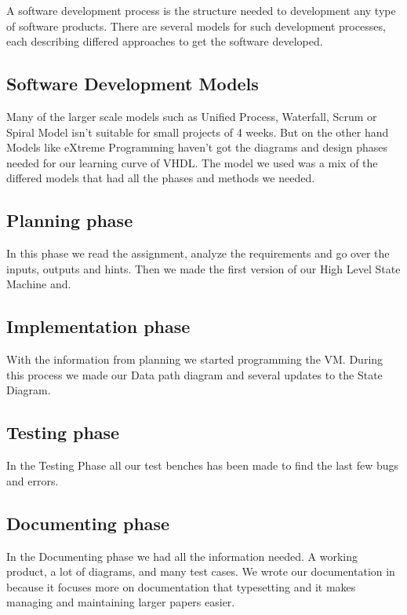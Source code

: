 A software development process is the structure needed to development any type of software products. 
There are several models for such development processes, each describing differed approaches to get the software developed.

\subsection{Software Development Models}
Many of the larger scale models such as Unified Process, Waterfall, Scrum or Spiral Model isn't suitable for small projects  of  4 weeks. But on the other hand Models like eXtreme Programming haven't got the diagrams and design phases needed for our learning curve of VHDL. The model we used was a mix of the differed models that had all the phases and methods we needed.

\subsection{Planning phase}
In this phase we read the assignment, analyze the requirements and go over the inputs, outputs and hints.
Then we made the first version of our High Level State Machine and.

\subsection{Implementation phase}
With the information from planning we started programming the VM. During this process we made our Data path diagram and several updates to the State Diagram.

\subsection{Testing phase}
In the Testing Phase all our test benches has been made to find the last few bugs and errors. 

\subsection{Documenting phase}
In the Documenting phase we had all the information needed. A working product, a lot of diagrams, and many test cases. We wrote our documentation in \LaTeXe  because it focuses more on documentation that typesetting and it makes managing and maintaining larger papers easier.